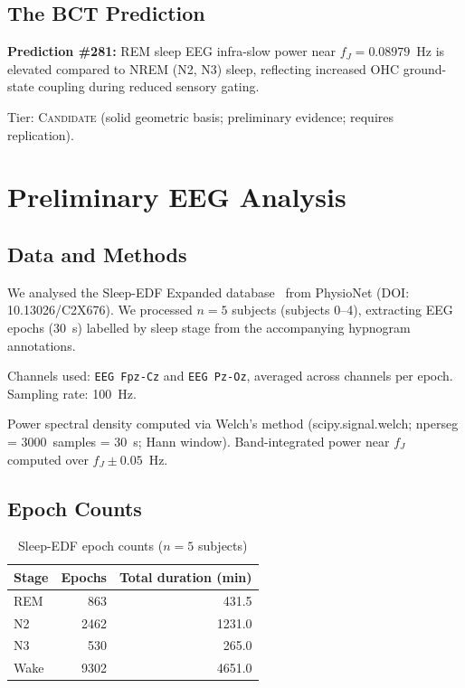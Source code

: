 \documentclass[aps,prl,twocolumn,showpacs,preprintnumbers]{revtex4-2}
\newcommand{\fJ}{f_J}
\begin{document}
\subsection{The BCT Prediction}

\textbf{Prediction \#281:} REM sleep EEG infra-slow power
near $\fJ = 0.08979$~Hz is elevated compared to NREM (N2, N3)
sleep, reflecting increased OHC ground-state coupling during
reduced sensory gating.

Tier: \textsc{Candidate} (solid geometric basis; preliminary
evidence; requires replication).

\section{Preliminary EEG Analysis}

\subsection{Data and Methods}

We analysed the Sleep-EDF Expanded database~\cite{sleepedf}
from PhysioNet (DOI: 10.13026/C2X676). We processed $n = 5$
subjects (subjects 0--4), extracting EEG epochs (30~s) labelled
by sleep stage from the accompanying hypnogram annotations.

Channels used: \texttt{EEG Fpz-Cz} and \texttt{EEG Pz-Oz},
averaged across channels per epoch. Sampling rate: 100~Hz.

Power spectral density computed via Welch's method
(scipy.signal.welch; nperseg = 3000~samples = 30~s;
Hann window). Band-integrated power near $\fJ$ computed
over $\fJ \pm 0.05$~Hz.

\subsection{Epoch Counts}

\begin{table}[h]
\centering
\caption{Sleep-EDF epoch counts ($n=5$ subjects)}
\begin{tabular}{lrr}
\toprule
Stage & Epochs & Total duration (min) \\
\midrule
REM  &  863 & 431.5 \\
N2   & 2462 & 1231.0 \\
N3   &  530 & 265.0 \\
Wake & 9302 & 4651.0 \\
\bottomrule
\end{tabular}
\end{table}
\end{document}
